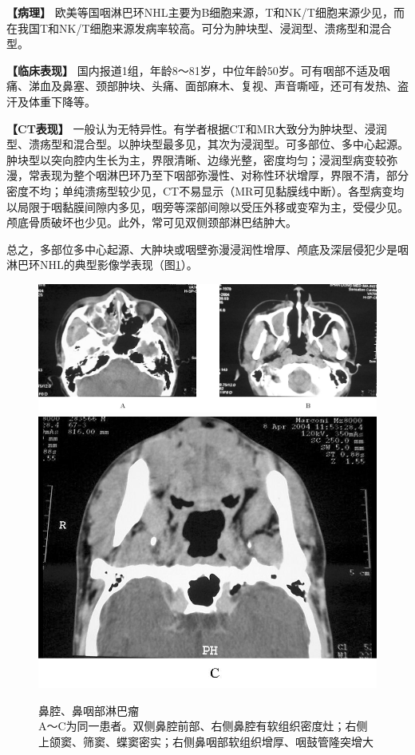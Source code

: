 \textbf{【病理】}
欧美等国咽淋巴环NHL主要为B细胞来源，T和NK/T细胞来源少见，而在我国T和NK/T细胞来源发病率较高。可分为肿块型、浸润型、溃疡型和混合型。

\textbf{【临床表现】}
国内报道1组，年龄8～81岁，中位年龄50岁。可有咽部不适及咽痛、涕血及鼻塞、颈部肿块、头痛、面部麻木、复视、声音嘶哑，还可有发热、盗汗及体重下降等。

\textbf{【CT表现】}
一般认为无特异性。有学者根据CT和MR大致分为肿块型、浸润型、溃疡型和混合型。以肿块型最多见，其次为浸润型。可多部位、多中心起源。肿块型以突向腔内生长为主，界限清晰、边缘光整，密度均匀；浸润型病变较弥漫，常表现为整个咽淋巴环乃至下咽部弥漫性、对称性环状增厚，界限不清，部分密度不均；单纯溃疡型较少见，CT不易显示（MR可见黏膜线中断）。各型病变均以局限于咽黏膜间隙内多见，咽旁等深部间隙以受压外移或变窄为主，受侵少见。颅底骨质破坏也少见。此外，常可见双侧颈部淋巴结肿大。

总之，多部位多中心起源、大肿块或咽壁弥漫浸润性增厚、颅底及深层侵犯少是咽淋巴环NHL的典型影像学表现（图\ref{fig6-8}）。



\begin{figure}[!htbp]
 \centering
 \includegraphics[width=.7\textwidth,height=\textheight,keepaspectratio]{./images/Image00149.jpg}
 \includegraphics[width=.7\textwidth,height=\textheight,keepaspectratio]{./images/Image00150.jpg}
 \captionsetup{justification=centering}
 \caption{鼻腔、鼻咽部淋巴瘤\\{\small A～C为同一患者。双侧鼻腔前部、右侧鼻腔有软组织密度灶；右侧上颌窦、筛窦、蝶窦密实；右侧鼻咽部软组织增厚、咽鼓管隆突增大}}
 \label{fig6-8}
  \end{figure} 

